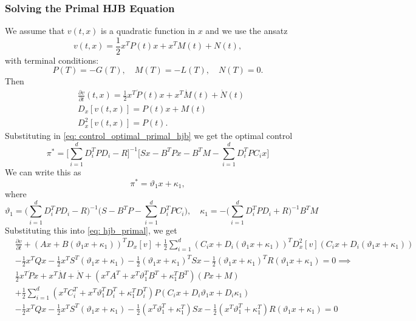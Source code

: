 \subsubsection{Solving the Primal HJB Equation}
We assume that $v(t,x)$ is a quadratic function in $x$ and we use the ansatz
\begin{equation}
    v(t,x) = \frac12 x^T P(t) x + x^T M(t) + N(t), 
    \label{eq: ansatz_primal_hjb}
\end{equation}
with terminal conditions:
\begin{equation}
    P(T) = -G(T), \quad M(T) = - L(T), \quad N(T) = 0. \label{eq: primal_hjb_terminal_conds}
\end{equation}
Then 
\begin{align*}
    &\frac{\partial v}{\partial t}(t,x) = \frac12 x^T \dot{P}(t) x + x^T \dot{M}(t) + \dot{N}(t)\\
    &D_x[v(t,x)] = P(t) x + M(t)\\
    &D^2_x[v(t,x)] = P(t).
\end{align*}
Substituting in \eqref{eq: control_optimal_primal_hjb} we get the optimal control
\begin{equation}
    \pi^\ast = \bigg[\sum_{i=1}^d D_i^T P D_i - R\bigg]^{-1} \bigg[S x - B^T P x - B^T M - \sum_{i=1}^d D_i^T P C_i x\bigg] \label{eq: primal_hjb_optimal_control}
\end{equation}
We can write this as 
\begin{equation*}
    \pi^\ast = \vartheta_1 x + \kappa_1,
\end{equation*}
where
\begin{equation}
    \vartheta_1 = \bigg(\sum_{i=1}^d D_i^T P D_i - R\bigg)^{-1} \bigg(S - B^T P - \sum_{i=1}^d D_i^T P C_i \bigg), \quad \kappa_1 = -\bigg(\sum_{i=1}^d D_i^T P D_i + R\bigg)^{-1} B^T M \label{eq: theta_kappa_primal_hjb}
\end{equation}
Substituting this into \eqref{eq: hjb_primal}, we get 
\begin{align*}
    &\frac{\partial v}{\partial t} + (A x + B (\vartheta_1 x + \kappa_1))^T D_x[v] + \frac12 \sum_{i=1}^d (C_i x + D_i (\vartheta_1 x + \kappa_1))^T D_x^2[v](C_i x + D_i (\vartheta_1 x + \kappa_1))\\
    &- \frac12 x^T Q x - \frac12 x^T S^T (\vartheta_1 x + \kappa_1) - \frac12 {(\vartheta_1 x + \kappa_1)}^T S x - \frac12 {(\vartheta_1 x + \kappa_1)}^T R (\vartheta_1 x + \kappa_1) = 0 \implies \\
    &\frac12 x^T \dot{P} x + x^T \dot{M} + \dot{N} + (x^T A^T + x^T \vartheta_1^T B^T + \kappa_1^T B^T)(P x + M)\\
    &+ \frac12 \sum_{i=1}^d (x^T C_i^T + x^T \vartheta_1^T D_i^T + \kappa_1^T D_i^T)P ( C_i x + D_i \vartheta_1 x + D_i \kappa_1)\\
    &- \frac12 x^T Q x - \frac12 x^T S^T (\vartheta_1 x + \kappa_1) - \frac12 {(x^T \vartheta_1^T  + \kappa_1^T)} S x - \frac12 {(x^T \vartheta_1^T + \kappa_1^T)} R (\vartheta_1 x + \kappa_1) = 0
\end{align*}
